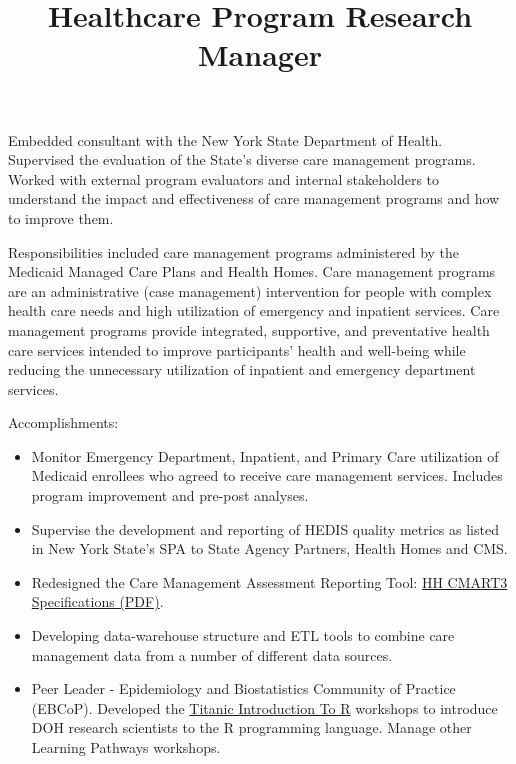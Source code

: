 \documentclass[line, mm, 10pt]{res}
\begin{document}
\begin{resume}
  \title{Healthcare Program Research Manager}
  \begin{position}
    Embedded consultant with the New York State Department of Health. Supervised
    the evaluation of the State's diverse care management programs. Worked with
    external program evaluators and internal stakeholders to understand the
    impact and effectiveness of care management programs and how to improve
    them.

    Responsibilities included care management programs administered by the
    Medicaid Managed Care Plans and Health Homes. Care management programs are
    an administrative (case management) intervention for people with complex
    health care needs and high utilization of emergency and inpatient services.
    Care management programs provide integrated, supportive, and preventative
    health care services intended to improve participants' health and well-being
    while reducing the unnecessary utilization of inpatient and emergency
    department services.

    Accomplishments:
    \begin{itemize}
    \item Monitor Emergency Department, Inpatient, and Primary Care
      utilization of Medicaid enrollees who agreed to receive care
      management services. Includes program improvement and pre-post
      analyses.
    \item Supervise the development and reporting of HEDIS quality
      metrics as listed in New York State's SPA to State Agency
      Partners, Health Homes and CMS.
    \item Redesigned the Care Management Assessment Reporting Tool:
      \href{https://www.health.ny.gov/health_care/medicaid/program/medicaid_health_homes/assessment_quality_measures/docs/hh_cmart_specs_v3.pdf}{HH
        CMART3 Specifications (PDF)}.
    \item Developing data-warehouse structure and ETL tools to combine
      care management data from a number of different data sources.
    \item Peer Leader - Epidemiology and Biostatistics Community of
      Practice (EBCoP). Developed the
      \href{http://choens.github.io/titanic/}{Titanic Introduction To
        R} workshops to introduce DOH research scientists to the R
      programming language. Manage other Learning Pathways workshops.
    \end{itemize}
  \end{position}


\end{resume}
\end{document}
